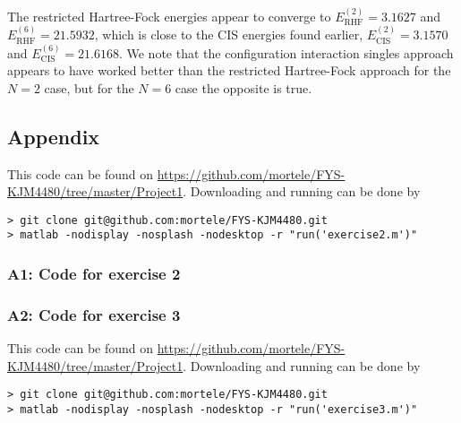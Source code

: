 \documentclass[a4paper]{article}
\begin{document}
The restricted Hartree-Fock energies appear to converge to $E_\text{RHF}^{(2)}=3.1627$ and $E_\text{RHF}^{(6)}=21.5932$, which is close to the CIS energies found earlier, $E_\text{CIS}^{(2)}=3.1570$ and $E_\text{CIS}^{(6)}=21.6168$. We note that the configuration interaction singles approach appears to have worked better than the restricted Hartree-Fock approach for the $N=2$ case, but for the $N=6$ case the opposite is true.

\newpage
\subsection*{Appendix}
This code can be found on \url{https://github.com/mortele/FYS-KJM4480/tree/master/Project1}. Downloading and running can be done by 
\begin{lstlisting}
> git clone git@github.com:mortele/FYS-KJM4480.git
> matlab -nodisplay -nosplash -nodesktop -r "run('exercise2.m')"
\end{lstlisting}
\subsubsection*{A1: Code for exercise 2}


\newpage
\subsubsection*{A2: Code for exercise 3}
This code can be found on \url{https://github.com/mortele/FYS-KJM4480/tree/master/Project1}. Downloading and running can be done by 
\begin{lstlisting}
> git clone git@github.com:mortele/FYS-KJM4480.git
> matlab -nodisplay -nosplash -nodesktop -r "run('exercise3.m')"
\end{lstlisting}

\end{document}
